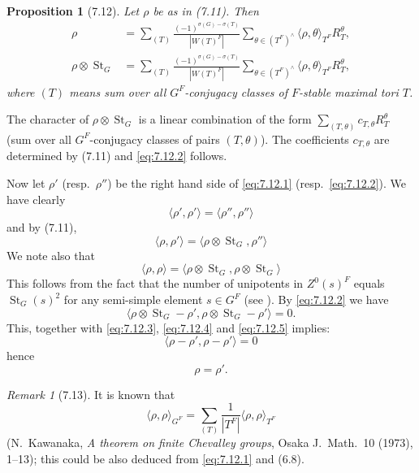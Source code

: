 \documentclass[11pt]{amsart}
\theoremstyle{plain}
\newtheorem{proposition}[theorem]{Proposition}
\theoremstyle{remark}
\newtheorem{remark}[theorem]{Remark}
\DeclareMathOperator{\St}{St}
\begin{document}
\begin{proposition}[7.12]
Let $\rho$ be as in (7.11). Then
\begin{align}
\label{eq:7.12.1} \rho &= \sum_{(T)} \frac{(-1)^{\sigma(G) - \sigma(T)}}{|W(T)^F|} \sum_{\theta \in (T^F)^\wedge} \langle \rho, \theta \rangle_{T^F} R_T^\theta, \\
\label{eq:7.12.2} \rho \otimes \St_G &= \sum_{(T)} \frac{(-1)^{\sigma(G) - \sigma(T)}}{|W(T)^F|} \sum_{\theta \in (T^F)^\wedge} \langle \rho, \theta \rangle_{T^F} R_T^\theta,
\end{align}
where $(T)$ means sum over all $G^F$-conjugacy classes of $F$-stable maximal tori $T$.
\end{proposition}

The character of $\rho \otimes \St_G$ is a linear combination of the form $\sum_{(T, \theta)} c_{T, \theta} R_T^\theta$ (sum over all $G^F$-conjugacy classes of pairs $(T, \theta)$). The coefficients $c_{T, \theta}$ are determined by (7.11) and \eqref{eq:7.12.2} follows.

Now let $\rho'$ (resp.\ $\rho''$) be the right hand side of \eqref{eq:7.12.1} (resp.\ \eqref{eq:7.12.2}). We have clearly
\begin{equation}\label{eq:7.12.3}
\langle \rho', \rho' \rangle = \langle \rho'', \rho'' \rangle
\end{equation}
and by (7.11),
\begin{equation}\label{eq:7.12.4}
\langle \rho, \rho' \rangle = \langle \rho \otimes \St_G, \rho'' \rangle
\end{equation}
We note also that
\begin{equation}\label{eq:7.12.5}
\langle \rho, \rho \rangle = \langle \rho \otimes \St_G, \rho \otimes \St_G \rangle
\end{equation}
This follows from the fact that the number of unipotents in $Z^0(s)^F$ equals $\St_G(s)^2$ for any semi-simple element $s \in G^F$ (see \cite[Thm.\ 15.1]{Stein}). By \eqref{eq:7.12.2} we have
\[
\langle \rho \otimes \St_G - \rho', \rho \otimes \St_G - \rho' \rangle = 0.
\]
This, together with \eqref{eq:7.12.3}, \eqref{eq:7.12.4} and \eqref{eq:7.12.5} implies:
\[
\langle \rho - \rho', \rho - \rho' \rangle = 0
\]
hence
\[
\rho = \rho'.
\]

\begin{remark}[7.13]
It is known that
\[
\langle \rho, \rho \rangle_{G^F} = \sum_{(T)} \frac{1}{|T^F|} \langle \rho, \rho \rangle_{T^F}
\]
(N.\ Kawanaka, \textit{A theorem on finite Chevalley groups}, Osaka J.\ Math.\ 10 (1973), 1--13); this could be also deduced from \eqref{eq:7.12.1} and (6.8).
\end{remark}
\end{document}
